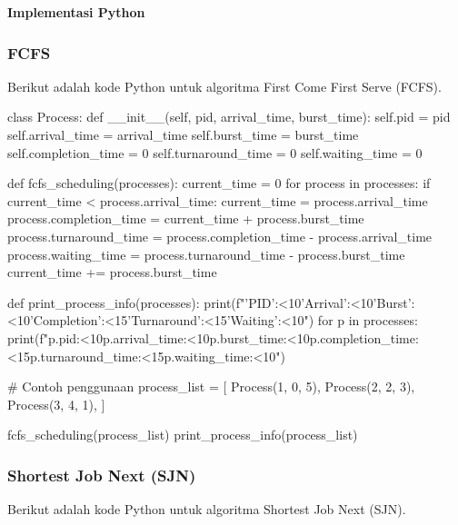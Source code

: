 \documentclass[12pt]{article}
\begin{document}
\textbf{Implementasi Python}

\subsubsection{FCFS}
Berikut adalah kode Python untuk algoritma First Come First Serve (FCFS).

\begin{python}[language=Python, caption=Kode Python untuk penjadwalan FCFS]
class Process:
    def __init__(self, pid, arrival_time, burst_time):
        self.pid = pid
        self.arrival_time = arrival_time
        self.burst_time = burst_time
        self.completion_time = 0
        self.turnaround_time = 0
        self.waiting_time = 0

def fcfs_scheduling(processes):
    current_time = 0
    for process in processes:
        if current_time < process.arrival_time:
            current_time = process.arrival_time
        process.completion_time = current_time + process.burst_time
        process.turnaround_time = process.completion_time - process.arrival_time
        process.waiting_time = process.turnaround_time - process.burst_time
        current_time += process.burst_time

def print_process_info(processes):
    print(f"{'PID':<10}{'Arrival':<10}{'Burst':<10}{'Completion':<15}{'Turnaround':<15}{'Waiting':<10}")
    for p in processes:
        print(f"{p.pid:<10}{p.arrival_time:<10}{p.burst_time:<10}{p.completion_time:<15}{p.turnaround_time:<15}{p.waiting_time:<10}")

# Contoh penggunaan
process_list = [
    Process(1, 0, 5),
    Process(2, 2, 3),
    Process(3, 4, 1),
]

fcfs_scheduling(process_list)
print_process_info(process_list)
\end{python}

\subsubsection{Shortest Job Next (SJN)}
Berikut adalah kode Python untuk algoritma Shortest Job Next (SJN).
\end{document}
